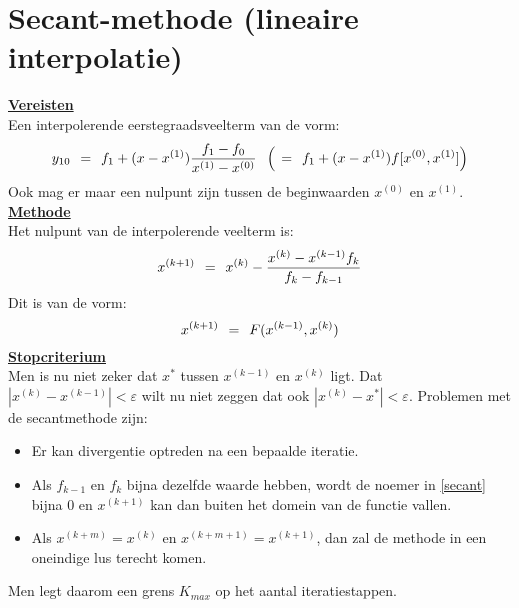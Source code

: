 \documentclass[11pt]{report}
\def \eq {\hspace{1.5mm}=\hspace{1.5mm}}
\def \h {\hspace{2mm}}
\begin{document}
\section{Secant-methode (lineaire interpolatie)}
	\underline{\textbf{Vereisten}}\\
	Een interpolerende eerstegraadsveelterm van de vorm:
	$$y_{10} \eq f_1 + (x - x^{(1)})\frac{f_1 - f_0}{x^{(1)} - x^{(0)}} \h\left(\eq f_1 + (x - x^{(1)})f[x^{(0)}, x^{(1)}]\right)$$
	Ook mag er maar een nulpunt zijn tussen de beginwaarden $x^{(0)}$ en $x^{(1)}$.
	\underline{\textbf{Methode}}\\
	Het nulpunt van de interpolerende veelterm is:
	\begin{equation}\label{secant}
		x^{(k+1)} \eq x^{(k)} - \frac{x^{(k)} - x^{(k-1)}f_k}{f_k - f_{k-1}}
	\end{equation}
	Dit is van de vorm:
	$$x^{(k+1)} \eq F(x^{(k-1)}, x^{(k)})$$
	\underline{\textbf{Stopcriterium}}\\
	Men is nu niet zeker dat $x^*$ tussen $x^{(k-1)}$ en $x^{(k)}$ ligt. Dat $|x^{(k)} - x^{(k-1)}| < \varepsilon$ wilt nu niet zeggen dat ook $|x^{(k)} - x^*| < \varepsilon$. Problemen met de secantmethode zijn:
	\begin{itemize}
		\item Er kan divergentie optreden na een bepaalde iteratie. 
		\item Als $f_{k-1}$ en $f_k$ bijna dezelfde waarde hebben, wordt de noemer in \ref{secant} bijna 0 en $x^{(k+1)}$ kan dan buiten het domein van de functie vallen.
		\item Als $x^{(k+m)} = x^{(k)}$ en $x^{(k+m+1)} = x^{(k+1)}$, dan zal de methode in een oneindige lus terecht komen.
	\end{itemize}
	Men legt daarom een grens $K_{max}$ op het aantal iteratiestappen.
	
\end{document}

